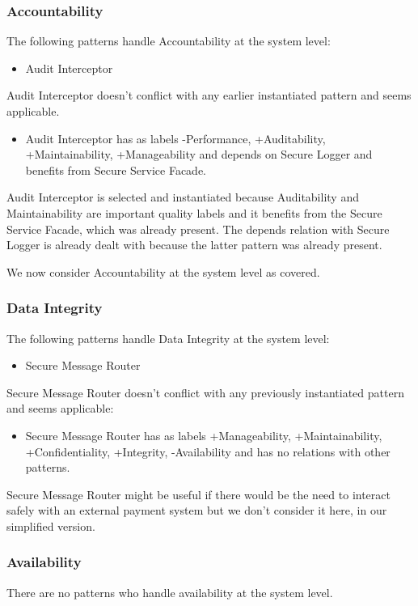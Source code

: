 \documentclass[a4paper,11pt]{report}
\begin{document}
\subsubsection{Accountability}
The following patterns handle Accountability at the system level:
\begin{itemize}
\item Audit Interceptor
\end{itemize}

Audit Interceptor doesn't conflict with any earlier instantiated pattern and seems applicable.

\begin{itemize}
\item Audit Interceptor has as labels -Performance, +Auditability, +Maintainability, +Manageability and depends on
Secure Logger and benefits from Secure Service Facade.
\end{itemize}

Audit Interceptor is selected and instantiated because Auditability and Maintainability are important quality
labels and it benefits from the Secure Service Facade, which was already present. The depends relation with
Secure Logger is already dealt with because the latter pattern was already present.

We now consider Accountability at the system level as covered.

\subsubsection{Data Integrity}
The following patterns handle Data Integrity at the system level:
\begin{itemize}
\item Secure Message Router
\end{itemize}

Secure Message Router doesn't conflict with any previously instantiated pattern and seems applicable:

\begin{itemize}
\item Secure Message Router has as labels +Manageability, +Maintainability, +Confidentiality, +Integrity, -Availability
and has no relations with other patterns.
\end{itemize}

Secure Message Router might be useful if there would be the need to interact safely with an external payment system
but we don't consider it here, in our simplified version.
\subsubsection{Availability}
There are no patterns who handle availability at the system level.
\end{document}
